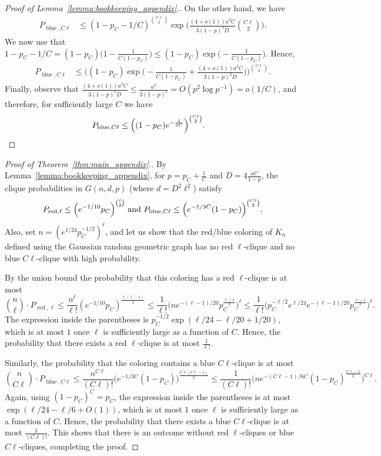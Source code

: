 \documentclass[11pt]{amsart}
\theoremstyle{definition}
\DeclareMathOperator{\red}{red}
\DeclareMathOperator{\blue}{blue}
\begin{document}
\begin{proof}[Proof of Lemma~\ref{lemma:bookkeeping_appendix}.]
On the other hand, we have 
{\smaller[0.3]
\begin{align*}
P_{\blue, C\ell}&\leq (1-p_C-1/C)^{\binom{C\ell}{2}}\exp\Big(\frac{(4+o(1))a^3C}{3(1-p)^3D}\binom{C\ell}{2}\Big).
\end{align*}
}
We now use that $1-p_C-1/C=(1-p_C)\big(1-\frac{1}{C(1-p_C)}\big)\leq (1-p_C)\exp\big(-\frac{1}{C(1-p_C)}\big)$.
Hence,
{\smaller[0.3]
\begin{align*}
P_{\blue, C\ell}&\leq \Big((1-p_C)\exp\Big(-\frac{1}{C(1-p_C)}+\frac{(4+o(1))a^3C}{3(1-p)^3D}\Big)\Big)^{\binom{C\ell}{2}}.
\end{align*}
}
Finally, observe that $\frac{(4+o(1))a^3C}{3(1-p)^3D}\leq \frac{a^2}{3(1-p)^2}=O(p^2 \log p^{-1})=o(1/C)$, and therefore, for sufficiently large $C$ we have 
{\smaller[0.3]
\begin{align*}
P_{\blue, C\ell}&\leq \Big((1-p_C)e^{-\frac{1}{3C}}\Big)^{\binom{C\ell}{2}}.\qedhere
\end{align*}
}
\end{proof}

\begin{proof}[Proof of Theorem~\ref{thm:main_appendix}.]
By Lemma~\ref{lemma:bookkeeping_appendix}, for $p=p_C+\frac{1}{C}$ and $D=4\frac{aC}{1-p}$, the clique probabilities in $G(n, d, p)$ (where $d=D^2\ell^2$) satisfy
{\smaller[0.3]
\[P_{{\rm red}, \ell}\leq \Big(e^{-1/10}p_C\Big)^{\binom{\ell}{2}} \text{ and } P_{{\rm blue}, C\ell}\leq \Big(e^{-1/3C}(1-p_C)\Big)^{\binom{C\ell}{2}}.\]
}
Also, set $n=(e^{1/24}p_C^{-1/2})^\ell$, and let us show that the red/blue coloring of $K_n$ defined using the Gaussian random geometric graph has no red $\ell$-clique and no blue $C\ell$-clique with high probability.

By the union bound the probability that this coloring has a red $\ell$-clique is at most
{\smaller[0.3]
\[\binom{n}{\ell}\cdot P_{\red, \ell}\leq \frac{n^{\ell}}{\ell!}(e^{-1/10}p_C)^{\frac{\ell(\ell-1)}{2}}\leq \frac{1}{\ell!}\Big(ne^{-(\ell-1)/20}p_C^{\frac{\ell-1}{2}}\Big)^\ell\leq \frac{1}{\ell!}\Big(p_C^{-\ell/2}e^{\ell/24}e^{-(\ell-1)/20}p_C^{\frac{\ell-1}{2}}\Big)^\ell.\]
}
The expression inside the parentheses is $p_C^{-1/2}\exp(\ell/24-\ell/20+1/20)$, which is at most $1$ once $\ell$ is sufficiently large as a function of $C$. Hence, the probability that there exists a red $\ell$-clique is at most $\frac{1}{\ell!}$.

Similarly, the probability that the coloring contains a blue $C\ell$-clique is at most
{\smaller[0.3]
\[\binom{n}{C\ell}\cdot P_{\blue, C\ell}\leq \frac{n^{C\ell}}{(C\ell)!}\big(e^{-1/3C}(1-p_C)\big)^{\frac{C\ell(C\ell-1)}{2}}\leq \frac{1}{(C\ell)!}\Big(ne^{-(C\ell-1)/6C}(1-p_C)^{\frac{C\ell-1}{2}}\Big)^{C\ell}.\]
}
Again, using $(1-p_C)^C=p_C$, the expression inside the parentheses is at most $\exp(\ell/24-\ell/6+O(1))$, which is at most $1$ once $\ell$ is sufficiently large as a function of $C$. Hence, the probability that there exists a blue $C\ell$-clique is at most $\frac{1}{(C\ell)!}$. This shows that there is an outcome without red $\ell$-cliques or blue $C\ell$-cliques, completing the proof.
\end{proof}
\end{document}
